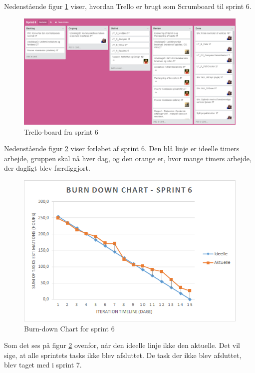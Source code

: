 Nedenstående figur \ref{Trello} viser, hvordan Trello er brugt som Scrumboard til sprint 6. 

\begin{figure}[H]
    \centering
    \includegraphics[width=1\textwidth]{figurer/d/Trello}
    \caption{Trello-board fra sprint 6}
    \label{Trello}
\end{figure}

Nedenstående figur \ref{Burn} viser forløbet af sprint 6. Den blå linje er ideelle timers arbejde, gruppen skal nå hver dag, og den orange er, hvor mange timers arbejde, der dagligt blev færdiggjort. 

\begin{figure}[H]
    \centering
    \includegraphics[width=1\textwidth]{figurer/d/Burn-down}
    \caption{Burn-down Chart for sprint 6}
    \label{Burn}
\end{figure}

Som det ses på figur \ref{Burn} ovenfor, når den ideelle linje ikke den aktuelle. Det vil sige, at alle sprintets tasks ikke blev afsluttet. De task der ikke blev afsluttet, blev taget med i sprint 7. 

